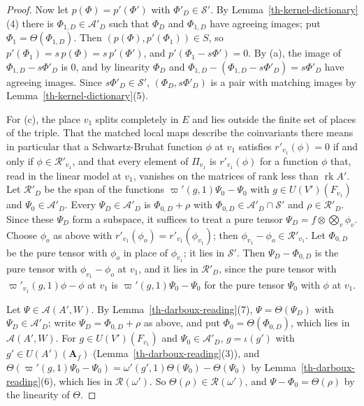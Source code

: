 \begin{proof}
Now let $p(\Phi)=p'(\Phi')$ with $\Phi'_D\in\mathcal S'$. By
Lemma~\ref{th-kernel-dictionary}(4) there is $\Phi_{1,D}\in\mathcal A'_D$
such that $\Phi_D$ and $\Phi_{1,D}$ have agreeing images; put
$\Phi_1=\Theta(\Phi_{1,D})$. Then $(p(\Phi),p'(\Phi_1))\in S$, so
$p'(\Phi_1)=s\,p(\Phi)=s\,p'(\Phi')$, and $p'(\Phi_1-s\Phi')=0$. By (a), the
image of $\Phi_{1,D}-s\Phi'_D$ is $0$, and by linearity $\Phi_D$ and
$\Phi_{1,D}-(\Phi_{1,D}-s\Phi'_D)=s\Phi'_D$ have agreeing images. Since
$s\Phi'_D\in\mathcal S'$, $(\Phi_D,s\Phi'_D)$ is a pair with matching images
by Lemma~\ref{th-kernel-dictionary}(5).

For (c), the place $v_1$ splits completely in $E$ and lies outside the finite
set of places of the triple. That the matched local maps describe the
coinvariants there means in particular that a Schwartz-Bruhat function
$\phi$ at $v_1$ satisfies $r'_{v_1}(\phi)=0$ if and only if
$\phi\in\mathcal R'_{v_1}$, and that every element of $\Pi_{v_1}$ is
$r'_{v_1}(\phi)$ for a function $\phi$ that, read in the linear model at
$v_1$, vanishes on the matrices of rank less than $\operatorname{rk}A'$. Let
$\mathcal R'_D$ be the span of the functions $\varpi'(g,1)\Psi_0-\Psi_0$ with
$g\in U(V')(F_{v_1})$ and $\Psi_0\in\mathcal A'_D$. Every
$\Psi_D\in\mathcal A'_D$ is $\Phi_{0,D}+\rho$ with
$\Phi_{0,D}\in\mathcal A'_D\cap\mathcal S'$ and $\rho\in\mathcal R'_D$. Since
these $\Psi_D$ form a subspace, it suffices to treat a pure tensor
$\Psi_D=f\otimes\bigotimes_v\phi_v$. Choose $\phi_o$ as above with
$r'_{v_1}(\phi_o)=r'_{v_1}(\phi_{v_1})$; then
$\phi_{v_1}-\phi_o\in\mathcal R'_{v_1}$. Let $\Phi_{0,D}$ be the pure tensor
with $\phi_o$ in place of $\phi_{v_1}$; it lies in $\mathcal S'$. Then
$\Psi_D-\Phi_{0,D}$ is the pure tensor with $\phi_{v_1}-\phi_o$ at $v_1$, and
it lies in $\mathcal R'_D$, since the pure tensor with
$\varpi'_{v_1}(g,1)\phi-\phi$ at $v_1$ is $\varpi'(g,1)\Psi_0-\Psi_0$ for
the pure tensor $\Psi_0$ with $\phi$ at $v_1$.

Let $\Psi\in\mathcal A(A',W)$. By Lemma~\ref{th-darboux-reading}(7),
$\Psi=\Theta(\Psi_D)$ with $\Psi_D\in\mathcal A'_D$; write
$\Psi_D=\Phi_{0,D}+\rho$ as above, and put $\Phi_0=\Theta(\Phi_{0,D})$, which
lies in $\mathcal A(A',W)$. For $g\in U(V')(F_{v_1})$ and
$\Psi_0\in\mathcal A'_D$, $g=\iota(g')$ with $g'\in U(A')(\mathbf A_f)$
(Lemma~\ref{th-darboux-reading}(3)), and
$\Theta(\varpi'(g,1)\Psi_0-\Psi_0)=\omega'(g',1)\Theta(\Psi_0)-\Theta(\Psi_0)$
by Lemma~\ref{th-darboux-reading}(6), which lies in $\mathcal R(\omega')$. So
$\Theta(\rho)\in\mathcal R(\omega')$, and $\Psi-\Phi_0=\Theta(\rho)$ by the
linearity of $\Theta$.


\end{proof}
